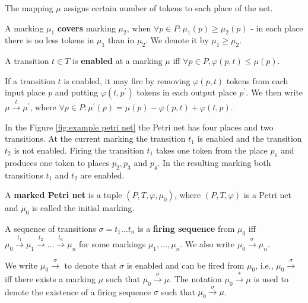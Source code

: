 The mapping $\mu$ assigns certain number of tokens to each place of the net.

\begin{definition}
  A marking $\mu_1$ {\bf covers} marking $\mu_2$, when $\forall p\in P: \mu_1(p)\geq\mu_2(p)$ - in each place there is no less tokens in $\mu_1$ than in $\mu_2$. We denote it by $\mu_1\geq\mu_2$.
\end{definition} 

\begin{definition}
  A transition $t\in T$ is {\bf enabled} at a marking $\mu$ iff $\forall p\in P, \varphi(p,t)\leq\mu(p)$.
\end{definition}

If a transition $t$ is enabled, it may fire by removing $\varphi(p,t)$ tokens from each input place $p$ and putting $\varphi(t,p^\prime)$ tokens in each output place $p^\prime$. We then write $\mu\xrightarrow{t} \mu^\prime$, where $\forall p\in P: \mu^\prime(p) = \mu(p)-\varphi(p,t)+\varphi(t,p)$.

\begin{example}
  In the Figure \ref{fig:example petri net} the Petri net has four places and two transitions. At the current marking the transition $t_1$ is enabled and the transition $t_2$ is not enabled. Firing the transition $t_1$ takes one token from the place $p_1$ and produces one token to places $p_2, p_3$ and $p_4$. In the resulting marking both transitions $t_1$ and $t_2$ are enabled.
\end{example}

\begin{definition}
  A {\bf marked Petri net} is a tuple $(P,T,\varphi,\mu_0)$, where $(P,T,\varphi)$ is a Petri net and $\mu_0$ is called the initial marking.
\end{definition}

\begin{definition}
  A sequence of transitions $\sigma = t_1\ldots t_n$ is a {\bf firing sequence} from $\mu_0$ iff $\mu_0\xrightarrow{t_1}\mu_1\xrightarrow{t_2}\ldots\xrightarrow{t_n}\mu_n$ for some markings $\mu_1,\ldots,\mu_n$. We also write $\mu_0\xrightarrow{\sigma}\mu_n$.
\end{definition}

We write $\mu_0\xrightarrow{\sigma}$ to denote that $\sigma$ is enabled and can be fired from $\mu_0$, i.e., $\mu_0\xrightarrow{\sigma}$ iff there exists a marking $\mu$ such that $\mu_0\xrightarrow{\sigma}\mu$.
The notation $\mu_0\xrightarrow{*}\mu$ is used to denote the existence of a firing sequence $\sigma$ such that $\mu_0\xrightarrow{\sigma}\mu$.


